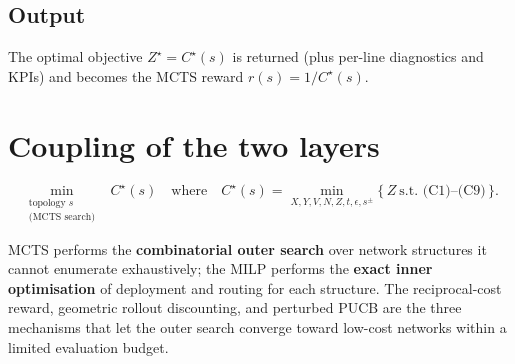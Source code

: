 \documentclass[11pt]{article}
\begin{document}
\subsection{Output}
The optimal objective $Z^\star = C^\star(s)$ is returned (plus per-line diagnostics and
KPIs) and becomes the MCTS reward $r(s)=1/C^\star(s)$.

\section{Coupling of the two layers}
\begin{equation}
\boxed{\;
\min_{\substack{\text{topology } s \\ \text{(MCTS search)}}}
\;\; C^\star(s)
\quad\text{where}\quad
C^\star(s) = \min_{X,Y,V,N,Z,t,\epsilon,s^\pm}
\big\{\, Z \ \text{s.t. (C1)--(C9)} \,\big\}.
\;}
\end{equation}

\noindent
MCTS performs the \textbf{combinatorial outer search} over network structures it cannot
enumerate exhaustively; the MILP performs the \textbf{exact inner optimisation} of
deployment and routing for each structure. The reciprocal-cost reward, geometric
rollout discounting, and perturbed PUCB are the three mechanisms that let the outer
search converge toward low-cost networks within a limited evaluation budget.
\end{document}
